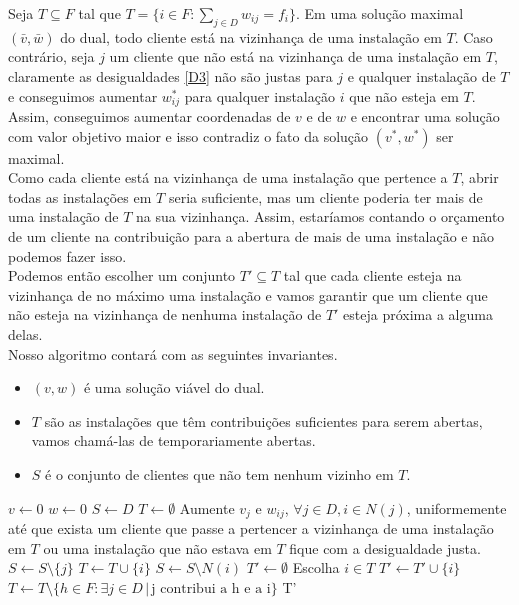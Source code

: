 \documentclass[12pt]{article}
\begin{document}
Seja $T \subseteq F$ tal que $T = \{i \in F: \sum_{j \in D} w_{ij} = f_i\}$. Em uma solução maximal $(\bar v, \bar w)$ do dual, todo cliente está na vizinhança de uma instalação em $T$. Caso contrário, seja $j$ um cliente que não está na vizinhança de uma instalação em $T$, claramente as desigualdades \eqref{D3} não são justas para $j$ e qualquer instalação de $T$ e conseguimos aumentar $w^*_{ij}$ para qualquer instalação $i$ que não esteja em $T$. Assim, conseguimos aumentar coordenadas de $v$ e de $w$ e encontrar uma solução com valor objetivo maior e isso contradiz o fato da solução $(v^*,w^*)$ ser maximal. \\
Como cada cliente está na vizinhança de uma instalação que pertence a $T$, abrir todas as instalações em $T$ seria suficiente, mas um cliente poderia ter mais de uma instalação de $T$ na sua vizinhança. Assim, estaríamos contando o orçamento de um cliente na contribuição para a abertura de mais de uma instalação e não podemos fazer isso.\\
Podemos então escolher um conjunto $T' \subseteq T$ tal que cada cliente esteja na vizinhança de no máximo uma instalação e vamos garantir que um cliente que não esteja na vizinhança de nenhuma instalação de $T'$ esteja próxima a alguma delas. \\
Nosso algoritmo contará com as seguintes invariantes.
\begin{itemize}
    \item $(v,w)$ é uma solução viável do dual.
    \item $T$ são as instalações que têm contribuições suficientes para serem abertas, vamos chamá-las de temporariamente abertas.
    \item $S$ é o conjunto de clientes que não tem nenhum vizinho em $T$.
\end{itemize}
\begin{algorithm}
    \begin{algorithmic}[1]
        \State $v \gets 0$
        \State $w \gets 0$
        \State $S \gets D$
        \State $T \gets \emptyset$
        \State Aumente $v_j$ e $w_{ij}$,  $\forall j \in D, i \in N(j)$, uniformemente até que exista um cliente que passe a pertencer a vizinhança de uma instalação em $T$ ou uma instalação que não estava em $T$ fique com a desigualdade justa.
        \State $S \gets S \setminus \{j\}$
        \EndIf
        \State $T \gets T \cup \{i\}$
        \State $S \gets S\setminus N(i)$
        \EndIf
        \EndWhile
        $T' \gets \emptyset$
        \State Escolha $i \in T$
        \State $T' \gets T' \cup \{i\}$
        \State $T \gets T \setminus \{h \in F : \exists j \in D \,|\, \text{j contribui a h e a i}\}$
        \EndWhile
        \State \Return T'
        \EndFunction
    \end{algorithmic}
\end{algorithm}
\end{document}
